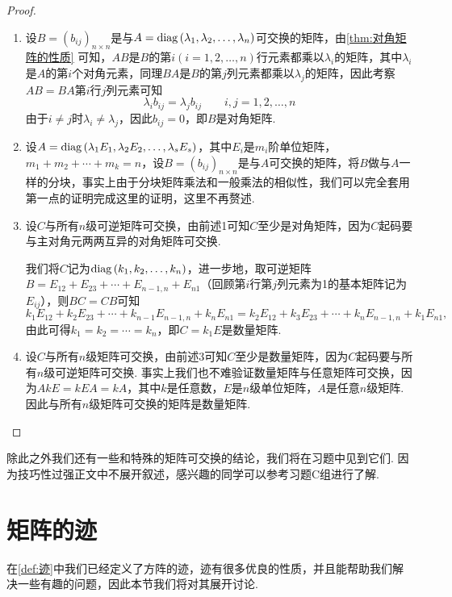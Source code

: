 \begin{proof}
    \begin{enumerate}
        \item 设$B=(b_{ij})_{n\times n}$是与$A=\operatorname{diag}{(\lambda_1,\lambda_2,\ldots,\lambda_n)}$可交换的矩阵，由\autoref{thm:对角矩阵的性质} 可知，$AB$是$B$的第$i(i=1,2,\ldots,n)$行元素都乘以$\lambda_i$的矩阵，其中$\lambda_i$是$A$的第$i$个对角元素，同理$BA$是$B$的第$j$列元素都乘以$\lambda_j$的矩阵，因此考察$AB=BA$第$i$行$j$列元素可知
              \[\lambda_ib_{ij}=\lambda_jb_{ij}\qquad i,j=1,2,\ldots,n\]
              由于$i\neq j$时$\lambda_i\neq\lambda_j$，因此$b_{ij}=0$，即$B$是对角矩阵.

        \item 设$A=\operatorname{diag}{(\lambda_1E_1,\lambda_2E_2,\ldots,\lambda_sE_s)}$，其中$E_i$是$m_i$阶单位矩阵，$m_1+m_2+\cdots+m_k=n$，设$B=(b_{ij})_{n\times n}$是与$A$可交换的矩阵，将$B$做与$A$一样的分块，事实上由于分块矩阵乘法和一般乘法的相似性，我们可以完全套用第一点的证明完成这里的证明，这里不再赘述.

        \item 设$C$与所有$n$级可逆矩阵可交换，由前述1可知$C$至少是对角矩阵，因为$C$起码要与主对角元两两互异的对角矩阵可交换.

              我们将$C$记为$\operatorname{diag}{(k_1,k_2,\ldots,k_n)}$，进一步地，取可逆矩阵$B=E_{12}+E_{23}+\cdots+E_{n-1,n}+E_{n1}$（回顾第$i$行第$j$列元素为1的基本矩阵记为$E_{ij}$），则$BC=CB$可知
              \[k_1E_{12}+k_2E_{23}+\cdots+k_{n-1}E_{n-1,n}+k_nE_{n1}=k_2E_{12}+k_3E_{23}+\cdots+k_nE_{n-1,n}+k_1E_{n1},\]
              由此可得$k_1=k_2=\cdots=k_n$，即$C=k_1E$是数量矩阵.

        \item 设$C$与所有$n$级矩阵可交换，由前述3可知$C$至少是数量矩阵，因为$C$起码要与所有$n$级可逆矩阵可交换. 事实上我们也不难验证数量矩阵与任意矩阵可交换，因为$AkE=kEA=kA$，其中$k$是任意数，$E$是$n$级单位矩阵，$A$是任意$n$级矩阵. 因此与所有$n$级矩阵可交换的矩阵是数量矩阵.
    \end{enumerate}
\end{proof}

除此之外我们还有一些和特殊的矩阵可交换的结论，我们将在习题中见到它们. 因为技巧性过强正文中不展开叙述，感兴趣的同学可以参考习题C组进行了解.

\section{矩阵的迹}

在\autoref{def:迹}中我们已经定义了方阵的迹，迹有很多优良的性质，并且能帮助我们解决一些有趣的问题，因此本节我们将对其展开讨论.

